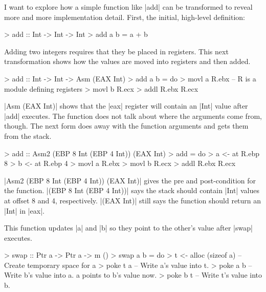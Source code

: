 \documentclass[11pt]{article}
\begin{document}
I want to explore how a simple function like |add| can be transformed
to reveal more and more implementation detail. First, the initial,
high-level definition:

> add :: Int -> Int -> Int
> add a b = a + b

Adding two integers requires that they be placed in registers. This
next transformation shows how the values are moved into registers and
then added.

> add :: Int -> Int -> Asm (EAX Int)
> add a b = do
>   movl a R.ebx -- R is a module defining registers
>   movl b R.ecx
>   addl R.ebx R.ecx

|Asm (EAX Int)| shows that the |eax| register will contain an |Int|
value after |add| executes. The function does not talk about where the
arguments come from, though. The next form does away with the function
arguments and gets them from the stack.

> add :: Asm2 (EBP 8 Int (EBP 4 Int)) (EAX Int)
> add = do 
>   a <- at R.ebp 8
>   b <- at R.ebp 4 
>   movl a R.ebx
>   movl b R.ecx
>   addl R.ebx R.ecx

|Asm2 (EBP 8 Int (EBP 4 Int)) (EAX Int)| gives the pre and
post-condition for the function. |(EBP 8 Int (EBP 4 Int))| says the
stack should contain |Int| values at offset 8 and 4,
respectively. |(EAX Int)| still says the function should return an
|Int| in |eax|.

This function updates |a| and |b| so they point
to the other's value after |swap| executes.

> swap :: Ptr a -> Ptr a -> m ()
> swap a b = do
>   t <- alloc (sizeof a) -- Create temporary space for a
>   poke t a -- Write a's value into t.
>   poke a b -- Write b's value into a. a points to b's value now.
>   poke b t -- Write t's value into b. 
\end{document}
